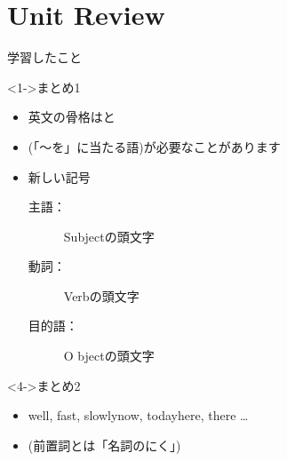 \documentclass[aspectratio=169,xcolor={dvipsnames,table}]{beamer}
\begin{document}
\section{Unit Review}
\begin{frame}[plain]{学習したこと}
\begin{block}<1->{まとめ1}
\begin{itemize}[square]\small
 \item<1-> 英文の骨格はと
 \item<2-> (「～を」に当たる語)が必要なことがあります
 \item<3-> 新しい記号
        \begin{description}
	\item[主語：] S\hfill{ubjectの頭文字} 
	\item[動詞：] V\hfill{erbの頭文字}
	\item[目的語：] O \hfill{bjectの頭文字}
       \end{description}
\end{itemize}
 \end{block}
\begin{block}<4->{まとめ2}\small
{}
\begin{itemize}[square]\small
 \item<5-> %
\hspace{60pt}{\scriptsize 様態：}well, fast, slowly\hspace{15pt}{\scriptsize とき：}now, today\hspace{15pt}{\scriptsize 場所：}here, there \ldots
\item<6-> %
\hspace{20pt}{in, on, with, before, after \ldots}\hfill{\scriptsize  (前置詞とは「名詞のにく」)}
\end{itemize}

\hfill{}
 \end{block}
\end{frame}
\end{document}
